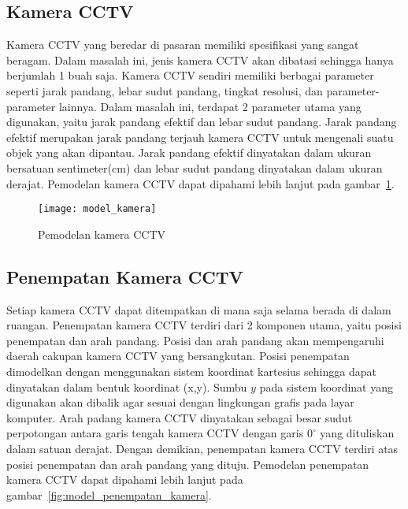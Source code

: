 \subsection{Kamera CCTV}
Kamera CCTV yang beredar di pasaran memiliki spesifikasi yang sangat beragam. Dalam masalah ini, jenis kamera CCTV akan dibatasi sehingga hanya berjumlah 1 buah saja. Kamera CCTV sendiri memiliki berbagai parameter seperti jarak pandang, lebar sudut pandang, tingkat resolusi, dan parameter-parameter lainnya. Dalam masalah ini, terdapat 2 parameter utama yang digunakan, yaitu jarak pandang efektif dan lebar sudut pandang. Jarak pandang efektif merupakan jarak pandang terjauh kamera CCTV untuk mengenali suatu objek yang akan dipantau. Jarak pandang efektif dinyatakan dalam ukuran bersatuan sentimeter(cm) dan lebar sudut pandang dinyatakan dalam ukuran derajat. Pemodelan kamera CCTV dapat dipahami lebih lanjut pada gambar~\ref{fig:model_kamera}.


\begin{figure}[h]
	\centering  
	\texttt{[image: model\_kamera]}
	\caption[Pemodelan kamera CCTV]{Pemodelan kamera CCTV} 
	\label{fig:model_kamera}
\end{figure}

\subsection{Penempatan Kamera CCTV}
Setiap kamera CCTV dapat ditempatkan di mana saja selama berada di dalam ruangan. Penempatan kamera CCTV terdiri dari 2 komponen utama, yaitu posisi penempatan dan arah pandang. Posisi dan arah pandang akan mempengaruhi daerah cakupan kamera CCTV yang bersangkutan. Posisi penempatan dimodelkan dengan menggunakan sistem koordinat kartesius sehingga dapat dinyatakan dalam bentuk koordinat (x,y). Sumbu \(y\) pada sistem koordinat yang digunakan akan dibalik agar sesuai dengan lingkungan grafis pada layar komputer. Arah padang kamera CCTV dinyatakan sebagai besar sudut perpotongan antara garis tengah kamera CCTV dengan garis \(0^\circ\) yang dituliskan dalam satuan derajat. Dengan demikian, penempatan kamera CCTV terdiri atas posisi penempatan dan arah pandang yang dituju. Pemodelan penempatan kamera CCTV dapat dipahami lebih lanjut pada gambar~\ref{fig:model_penempatan_kamera}.

